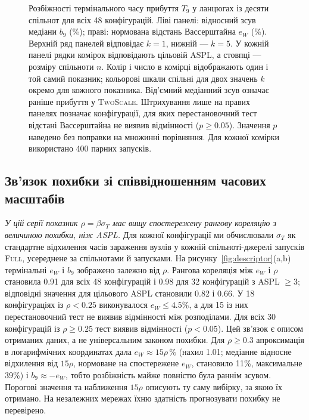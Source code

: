 \documentclass[a4paper,fleqn]{cas-sc}
\newcommand{\Full}{\textup{\textsc{Full}}}
\newcommand{\TS}{\textup{\textsc{TwoScale}}}
\newcommand{\eW}{e_{W}}
\begin{document}
\begin{figure}[tbp]
\caption{Розбіжності термінального часу прибуття $T_9$ у ланцюгах із десяти спільнот для всіх 48 конфігурацій. Ліві панелі: відносний зсув медіани $b_9$ (\%); праві: нормована відстань Вассерштайна $\eW$ (\%). Верхній ряд панелей відповідає $k=1$, нижній --- $k=5$. У кожній панелі рядки комірок відповідають цільовій ASPL, а стовпці --- розміру спільноти $n$. Колір і число в комірці відображають один і той самий показник; кольорові шкали спільні для двох значень $k$ окремо для кожного показника. Від'ємний медіанний зсув означає раніше прибуття у \TS{}. Штрихування лише на правих панелях позначає конфігурації, для яких перестановочний тест відстані Вассерштайна не виявив відмінності ($p\ge0.05$). Значення $p$ наведено без поправки на множинні порівняння. Для кожної комірки використано 400 парних запусків.}
\label{fig:accuracy_map}
\end{figure}

\subsection{Зв’язок похибки зі співвідношенням часових масштабів}
\label{sec:res_descriptor}

\emph{У цій серії показник $\rho=\beta\sigma_T$ має вищу спостережену рангову кореляцію з величиною похибки, ніж ASPL.} Для кожної конфігурації ми обчислювали $\sigma_T$ як стандартне відхилення часів зараження вузлів у кожній спільноті-джерелі запусків \Full{}, усереднене за спільнотами й запусками. На рисунку~\ref{fig:descriptor}(a,b) термінальні $\eW$ і $b_9$ зображено залежно від $\rho$. Рангова кореляція між $\eW$ і $\rho$ становила 0.91 для всіх 48 конфігурацій і 0.98 для 32 конфігурацій з ASPL $\ge3$; відповідні значення для цільового ASPL становили 0.82 і 0.66. У 18 конфігураціях із $\rho<0.25$ виконувалося $\eW\le4.5\%$, а для 15 із них перестановочний тест не виявив відмінності між розподілами. Для всіх 30 конфігурацій із $\rho\ge0.25$ тест виявив відмінності ($p<0.05$). Цей зв’язок є описом отриманих даних, а не універсальним законом похибки. Для $\rho\ge0.3$ апроксимація в логарифмічних координатах дала $\eW\approx15\rho\,\%$ (нахил 1.01; медіанне відносне відхилення від $15\rho$, нормоване на спостережене $\eW$, становило 11\%, максимальне 39\%) і $b_9\approx-\eW$, тобто розбіжність майже повністю була раннім зсувом. Порогові значення та наближення $15\rho$ описують ту саму вибірку, за якою їх отримано. На незалежних мережах їхню здатність прогнозувати похибку не перевірено.
\end{document}
